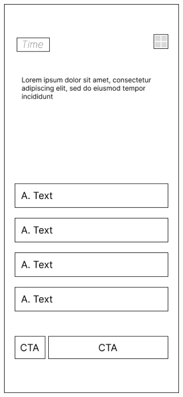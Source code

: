 \begin{figure}[H]
	\centering
	\begin{subfigure}[b]{0.3\textwidth}
		\centering
	  \includegraphics[width=\linewidth]{contents/chapter-3/images/MF-kuis-3.png}

\end{subfigure}
\end{figure}
